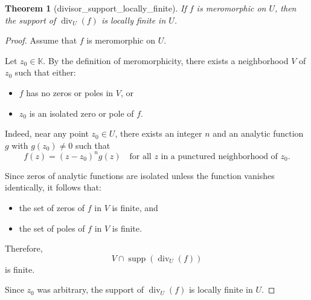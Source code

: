 \documentclass{article}
\newtheorem{theorem}{Theorem}
\begin{document}
\begin{theorem}[divisor_support_locally_finite]
If $f$ is meromorphic on $U$, then the support of $\operatorname{div}_U(f)$ is locally finite in $U$.
\end{theorem}
\begin{proof}
Assume that $f$ is meromorphic on $U$.

Let $z_0 \in \mathbb K$. By the definition of meromorphicity, there exists a neighborhood $V$ of $z_0$ such that either:
\begin{itemize}
  \item $f$ has no zeros or poles in $V$, or
  \item $z_0$ is an isolated zero or pole of $f$.
\end{itemize}

Indeed, near any point $z_0 \in U$, there exists an integer $n$ and an analytic function $g$ with $g(z_0) \neq 0$ such that
\[
f(z) = (z - z_0)^n g(z)
\quad \text{for all } z \text{ in a punctured neighborhood of } z_0.
\]

Since zeros of analytic functions are isolated unless the function vanishes identically, it follows that:
\begin{itemize}
  \item the set of zeros of $f$ in $V$ is finite, and
  \item the set of poles of $f$ in $V$ is finite.
\end{itemize}

Therefore,
\[
V \cap \operatorname{supp}(\operatorname{div}_U(f))
\]
is finite.

Since $z_0$ was arbitrary, the support of $\operatorname{div}_U(f)$ is locally finite in $U$.
\end{proof}
\end{document}
